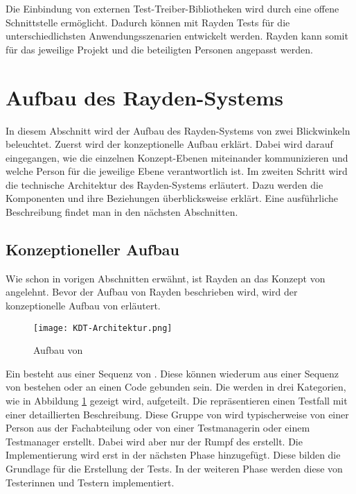 \SuperPar
Die Einbindung von externen Test-Treiber-Bibliotheken wird durch eine offene Schnittstelle ermöglicht. Dadurch können mit Rayden Tests für die unterschiedlichsten Anwendungsszenarien entwickelt werden. Rayden kann somit für das jeweilige Projekt und die beteiligten Personen angepasst werden. 


\section{Aufbau des Rayden-Systems}

In diesem Abschnitt wird der Aufbau des Rayden-Systems von zwei Blickwinkeln beleuchtet. Zuerst wird der konzeptionelle Aufbau erklärt. Dabei wird darauf eingegangen, wie die einzelnen Konzept-Ebenen miteinander kommunizieren und welche Person für die jeweilige Ebene verantwortlich ist. Im zweiten Schritt wird die technische Architektur des Rayden-Systems erläutert. Dazu werden die Komponenten und ihre Beziehungen überblicksweise erklärt. Eine ausführliche Beschreibung findet man in den nächsten Abschnitten.

\subsection{Konzeptioneller Aufbau}

Wie schon in vorigen Abschnitten erwähnt, ist Rayden an das Konzept von  angelehnt. Bevor der Aufbau von Rayden beschrieben wird, wird der konzeptionelle Aufbau von  erläutert. 

\begin{figure}[h]
\centering
\texttt{[image: KDT-Architektur.png]}
\caption{Aufbau von }
\label{fig:kdt-arch}
\end{figure}

\SuperPar
Ein  besteht aus einer Sequenz von . Diese  können wiederum aus einer Sequenz von  bestehen oder an einen Code gebunden sein. Die  werden in drei Kategorien, wie in Abbildung \ref{fig:kdt-arch} gezeigt wird, aufgeteilt. Die  repräsentieren einen Testfall mit einer detaillierten Beschreibung. Diese Gruppe von  wird typischerweise von einer Person aus der Fachabteilung oder von einer Testmanagerin oder einem Testmanager erstellt. Dabei wird aber nur der Rumpf des  erstellt. Die Implementierung wird erst in der nächsten Phase hinzugefügt. Diese  bilden die Grundlage für die Erstellung der Tests. In der weiteren Phase werden diese  von Testerinnen und Testern implementiert.


